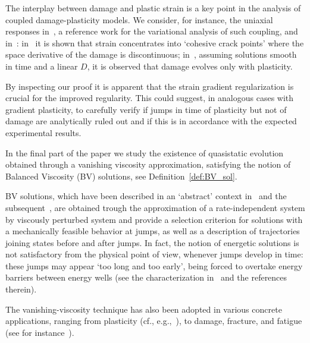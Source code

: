 \documentclass[reqno]{amsart}
\theoremstyle{definition}
\numberwithin{equation}{section}
\begin{document}
The interplay between damage and plastic strain is a key point in the analysis of coupled damage-plasticity models. We consider, for instance, the uniaxial responses in~\cite{AMV}, a reference work for the variational analysis of such coupling, and in~\cite{KazMar18}: in~\cite{AMV} it is shown that strain concentrates into  `cohesive crack points' where the space derivative of the damage is discontinuous; in~\cite{KazMar18}, assuming solutions smooth in time and a linear $D$, it is observed that damage evolves only with plasticity.

By inspecting our proof it is apparent that the strain gradient regularization is crucial for the improved regularity. This could suggest, in analogous cases with gradient plasticity, to carefully verify if jumps in time of plasticity but not of damage are analytically ruled out and if this is in accordance with the expected experimental results.  

In the final part of the paper we study the existence of quasistatic evolution obtained through a vanishing viscosity approximation, satisfying the notion of Balanced Viscosity (BV) solutions, see Definition~\ref{def:BV_sol}.


BV solutions, which have been described in an ‘abstract’ context in~\cite{EfMi} and the subsequent~\cite{MieRosSav12, MieRosSav13}, are obtained trough the approximation of a rate-independent system by viscously perturbed system and provide a selection criterion for solutions with a mechanically feasible behavior at jumps, as well as a description of trajectories joining states before and after jumps. In fact,
the notion of energetic solutions is not satisfactory from the physical point of view, whenever jumps develop in time: these jumps may appear ‘too long and too early’, being forced to overtake energy barriers between energy wells (see the characterization in~\cite{RosSav12} and the references therein).


The vanishing-viscosity technique has also  been adopted in various concrete applications, ranging from plasticity  (cf., e.g.,~\cite{DMDMM08, DMSo, DMDSSo, BabFraMor12, FrSt2013, Sol14}), to damage,  fracture, and fatigue  (see for instance~\cite{KnMiZa08ILMC, Lazzaroni-Toader, KRZ, CrLa, AlmLazLuc19, ACO2018, CrRo19}).
\end{document}
